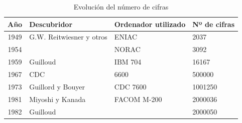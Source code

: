 \documentclass[spanish,a4paper,11pt]{article}
\begin{document}
\begin{table}[!ht]
\begin{center}
\begin{tabular}{|c|l|l|l|}
\hline
Año & Descubridor & Ordenador utilizado & Nº de cifras \\ \hline
1949 & G.W. Reitwiesner y otros & ENIAC & 2037 \\ \hline
1954 & & NORAC & 3092 \\ \hline
1959 & Guilloud & IBM 704 & 16167 \\ \hline
1967 & CDC & 6600 & 500000 \\ \hline
1973 & Guillord y Bouyer & CDC 7600 & 1001250 \\ \hline
1981 & Miyoshi y Kanada & FACOM M-200 & 2000036 \\ \hline
1982 & Guilloud & &	2000050 \\ \hline
\end{tabular}
\end{center}
\caption{Evolución del número de cifras}
\label{tiempo}
\end{table}







\end{document}
